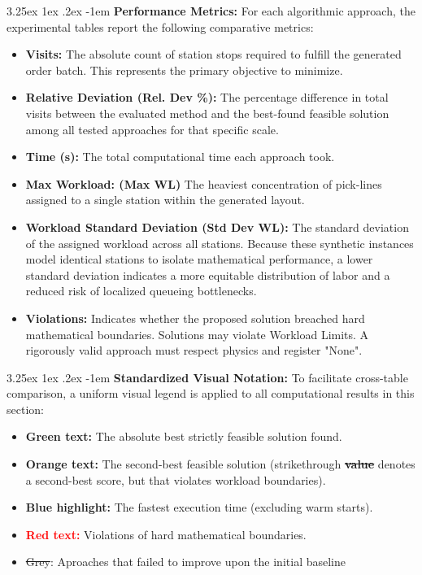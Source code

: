 \documentclass[preprint,review,11pt,authoryear]{elsarticle}
\makeatletter
\renewcommand\paragraph{\@startsection{paragraph}{4}{\z@}
  {3.25ex \@plus1ex \@minus.2ex}
  {-1em}
  {\normalfont\normalsize\itshape}}
\makeatother
\begin{document}
\paragraph{\textbf{Performance Metrics:}}
For each algorithmic approach, the experimental tables report the following comparative metrics:
\begin{itemize} 
    \item \textbf{Visits:} The absolute count of station stops required to fulfill the generated order batch. This represents the primary objective to minimize.
    \item \textbf{Relative Deviation (Rel. Dev \%):} The percentage difference in total visits between the evaluated method and the best-found feasible solution among all tested approaches for that specific scale.
    \item \textbf{Time (s):} The total computational time each approach took.
    \item \textbf{Max Workload: (Max WL)} The heaviest concentration of pick-lines assigned to a single station within the generated layout. 
    \item \textbf{Workload Standard Deviation (Std Dev WL):} The standard deviation of the assigned workload across all stations. Because these synthetic instances model identical stations to isolate mathematical performance, a lower standard deviation indicates a more equitable distribution of labor and a reduced risk of localized queueing bottlenecks.
    \item \textbf{Violations:} Indicates whether the proposed solution breached hard mathematical boundaries. Solutions may violate Workload Limits. A rigorously valid approach must respect physics and register "None".
\end{itemize}

\paragraph{\textbf{Standardized Visual Notation:}}
To facilitate cross-table comparison, a uniform visual legend is applied to all computational results in this section:
\begin{itemize} 
    \item \textcolor{green!60!black}{\textbf{Green text:}} The absolute best strictly feasible solution found.
   \item \textcolor{orange!90!black}{\textbf{Orange text:}} The second-best feasible solution (strikethrough \textcolor{orange!90!black}
   {\textbf{\sout{value}}} denotes a second-best score, but that violates workload boundaries).
    \item \colorbox{blue!10}{\textbf{Blue highlight:}} The fastest execution time (excluding warm starts).
    \item \textcolor{red}{\textbf{Red text:}} Violations of hard mathematical boundaries.
    \item \color{gray}\sout{Grey}\color{black}: Aproaches that failed to improve upon the initial baseline
\end{itemize}
\end{document}
